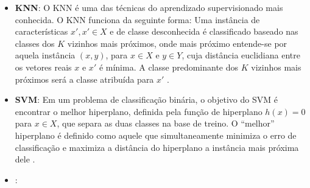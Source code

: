 \begin{itemize}
 \item \textbf{KNN}: O KNN é uma das técnicas do aprendizado supervisionado mais conhecida. 
 O KNN funciona da seguinte forma: Uma instância de características $x',x'\in X$
 e de classe desconhecida é classificado baseado
 nas classes dos $K$ vizinhos mais próximos, onde mais próximo entende-se por aquela instância
 $(x,y)$, para $x \in X$ e $y \in Y$,
 cuja distância euclidiana entre os vetores reais $x$ e $x'$ é mínima. 
 A classe predominante dos $K$ vizinhos mais próximos será a classe atribuída para $x'$ \cite{topalgos2008}.
 
 \item \textbf{SVM}: 
 Em um problema de classificação binária, o objetivo do SVM é encontrar o melhor hiperplano, 
 definida pela função de hiperplano $h(x)=0$ para $x \in X$,
 que separa as duas classes na base de treino.
 O ``melhor'' hiperplano é definido como aquele que simultaneamente minimiza
 o erro de classificação e maximiza a distância do hiperplano a instância mais próxima dele \cite{topalgos2008}. 
 
 
 \item \textbf{\jqo}: 
 
 

\end{itemize}

